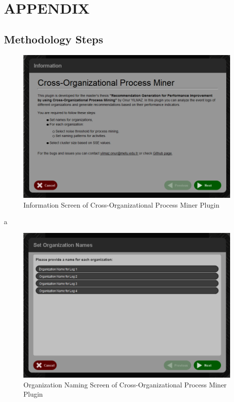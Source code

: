 \chapter{APPENDIX}

\section{Methodology Steps}
\label{sec:appendix-methodology-steps}


\begin{figure}
	\centering
	\includegraphics[width=\textwidth]{10_appendix/information-screen}
	\caption{Information Screen of Cross-Organizational Process Miner Plugin}
	\label{fig:information-screen}
\end{figure}
a

\begin{figure}
	\centering
	\includegraphics[width=\textwidth]{10_appendix/organization-name-screen}
	\caption{Organization Naming Screen of Cross-Organizational Process Miner Plugin}
  \label{fig:organization-name-screen}
\end{figure}


